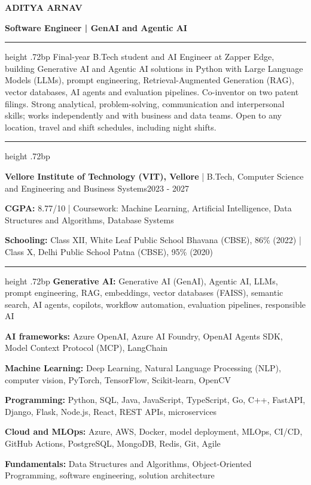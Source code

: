 \documentclass[10pt]{article}
\newcommand{\resumesection}[1]{\par\vspace{5.4bp}{\fontsize{10.56bp}{12.5bp}\selectfont\bfseries #1\par}\vspace{1bp}\hrule height .72bp\vspace{3.2bp}}
\newcommand{\entry}[2]{\par #1\hfill #2\par}
\begin{document}
\fontsize{9.48bp}{11.6bp}\selectfont
{\centering
{\fontsize{18bp}{21bp}\selectfont\bfseries ADITYA ARNAV\par}
\vspace{1bp}
{\fontsize{10.56bp}{12.6bp}\selectfont\bfseries Software Engineer | GenAI and Agentic AI\par}
\vspace{.3bp}
{\fontsize{9bp}{11bp}\selectfont{}\par}}

\resumesection{SUMMARY}
Final-year B.Tech student and AI Engineer at Zapper Edge, building Generative AI and Agentic AI solutions in Python with Large Language Models (LLMs), prompt engineering, Retrieval-Augmented Generation (RAG), vector databases, AI agents and evaluation pipelines. Co-inventor on two patent filings. Strong analytical, problem-solving, communication and interpersonal skills; works independently and with business and data teams. Open to any location, travel and shift schedules, including night shifts.

\resumesection{EDUCATION}
\entry{\textbf{Vellore Institute of Technology (VIT), Vellore} | B.Tech, Computer Science and Engineering and Business Systems}{2023 - 2027}
\textbf{CGPA:} 8.77/10 | Coursework: Machine Learning, Artificial Intelligence, Data Structures and Algorithms, Database Systems\par
\vspace{.6bp}
\textbf{Schooling:} Class XII, White Leaf Public School Bhavana (CBSE), 86\% (2022) | Class X, Delhi Public School Patna (CBSE), 95\% (2020)

\resumesection{TECHNICAL SKILLS}
\textbf{Generative AI:} Generative AI (GenAI), Agentic AI, LLMs, prompt engineering, RAG, embeddings, vector databases (FAISS), semantic search, AI agents, copilots, workflow automation, evaluation pipelines, responsible AI\par
\vspace{.6bp}
\textbf{AI frameworks:} Azure OpenAI, Azure AI Foundry, OpenAI Agents SDK, Model Context Protocol (MCP), LangChain\par
\vspace{.6bp}
\textbf{Machine Learning:} Deep Learning, Natural Language Processing (NLP), computer vision, PyTorch, TensorFlow, Scikit-learn, OpenCV\par
\vspace{.6bp}
\textbf{Programming:} Python, SQL, Java, JavaScript, TypeScript, Go, C++, FastAPI, Django, Flask, Node.js, React, REST APIs, microservices\par
\vspace{.6bp}
\textbf{Cloud and MLOps:} Azure, AWS, Docker, model deployment, MLOps, CI/CD, GitHub Actions, PostgreSQL, MongoDB, Redis, Git, Agile\par
\vspace{.6bp}
\textbf{Fundamentals:} Data Structures and Algorithms, Object-Oriented Programming, software engineering, solution architecture
\end{document}
